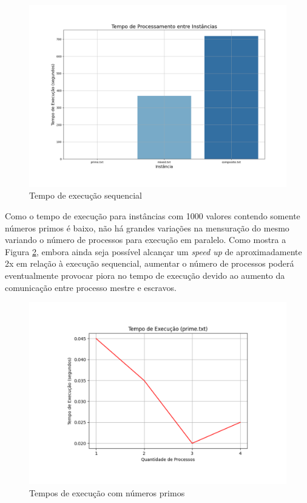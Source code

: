 \documentclass[a4paper, 12pt]{article}
\begin{document}
\vspace*{-1cm}
\begin{figure}[H]
    \centering
    \includegraphics[width=1.1\textwidth]{Images/sequential.pdf}
    \vspace*{-1.5cm}
    \caption{Tempo de execução sequencial}
    \label{fig:map1}
\end{figure}

Como o tempo de execução para instâncias com 1000 valores contendo somente números primos é baixo, não há grandes variações na mensuração do mesmo variando o número de processos para execução em paralelo. Como mostra a Figura \ref{fig:map2}, embora ainda seja possível alcançar um \emph{speed up} de aproximadamente 2x em relação à execução sequencial, aumentar o número de processos poderá eventualmente provocar piora no tempo de execução devido ao aumento da comunicação entre processo mestre e escravos.

\begin{figure}[H]
    \centering
    \includegraphics[width=1.1\textwidth]{Images/prime.pdf}
    \vspace*{-1.5cm}
    \caption{Tempos de execução com números primos}
    \label{fig:map2}
\end{figure}
\end{document}
